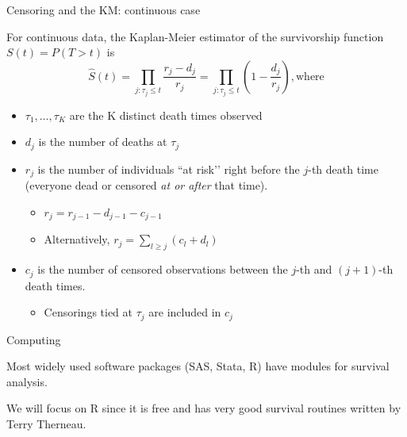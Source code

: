\documentclass[ignorenonframetext,]{beamer}
\providecommand{\tightlist}{%
  \setlength{\itemsep}{0pt}\setlength{\parskip}{0pt}}
\begin{document}
\begin{frame}{%
\protect\hypertarget{censoring-and-the-km-continuous-case}{%
Censoring and the KM: continuous case}}

For continuous data, the Kaplan-Meier estimator of the survivorship
function \(S(t)=P(T > t)\) is \[
\widehat{S}(t) = \prod_{j: \tau_j \leq t} \frac{ r_j - d_j } {r_j}
= \prod_{j: \tau_j \leq t} \left(1 - \frac{d_j}{r_j}\right), \text{where}
\]

\begin{itemize}
\tightlist
\item
  \(\tau_1, \ldots, \tau_K\) are the K distinct death times observed
\item
  \(d_j\) is the number of deaths at \(\tau_j\)
\item
  \(r_j\) is the number of individuals ``at risk’’ right before the
  \(j\)-th death time (everyone dead or censored \emph{at or after} that
  time).

  \begin{itemize}
  \tightlist
  \item
    \(r_j = r_{j-1} - d_{j-1} - c_{j-1}\)
  \item
    Alternatively, \(r_j = \sum_{l \ge j}(c_l+d_l)\)
  \end{itemize}
\item
  \(c_j\) is the number of censored observations between the \(j\)-th
  and \((j+1)\)-th death times.

  \begin{itemize}
  \tightlist
  \item
    Censorings tied at \(\tau_j\) are included in \(c_j\)
  \end{itemize}
\end{itemize}

\end{frame}

\begin{frame}{%
\protect\hypertarget{computing}{%
Computing}}

Most widely used software packages (SAS, Stata, R) have modules for
survival analysis.

We will focus on R since it is free and has very good survival routines
written by Terry Therneau.

\end{frame}
\end{document}
